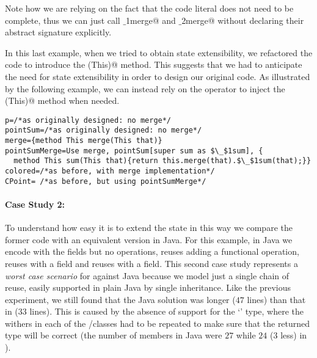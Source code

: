 Note how we are relying on the fact that the code literal
 does not need to be complete, 
thus we can just call \Q@$\_$1merge@ and \Q@$\_$2merge@ without
 declaring their abstract signature explicitly.

In this last example, when we tried to obtain state extensibility, we refactored the code to introduce  the \Q@merge(This)@ method.
This suggests that we had to
anticipate the need for state extensibility
in order to design our original code.
As illustrated by the following example, we can instead rely on the \Q@super@ operator to inject the \Q@merge(This)@ method when needed.

 \begin{lstlisting}
p=/*as originally designed: no merge*/
pointSum=/*as originally designed: no merge*/
merge={method This merge(This that)}
pointSumMerge=Use merge, pointSum[super sum as $\_$1sum], { 
  method This sum(This that){return this.merge(that).$\_$1sum(that);}}
colored=/*as before, with merge implementation*/
CPoint= /*as before, but using pointSumMerge*/
\end{lstlisting}  



\paragraph{Case Study 2:}
To understand how easy it is to extend the state in this
way we compare the former code with an equivalent version in
Java.
For this example, in Java we encode \Q@Point@ with the fields but no operations,
\Q@PointSum@ reuses \Q@Point@ adding a functional \Q@sum@ operation,
\Q@CPoint@ reuses \Q@PointSum@ with a \Q@Color@ field
and \Q@FCPoint@ reuses \Q@CPoint@ with a \Q@Flavour@ field.
This second case study represents a \emph{worst case scenario} for \name against Java because we model just a single chain of reuse,
easily supported in plain Java by single inheritance.
Like the previous experiment, we still found that the Java solution was longer ($47$ lines) than that
in \name ($33$ lines). This is caused by the absence of support for the `\Q@This@' type,
where the withers in each of the \Q@CPoint@/\Q@FCpoint@ classes had to be repeated
to make sure that the returned type will be correct (the number of members in Java were $27$ while $24$ ($3$ less)
in \name).

